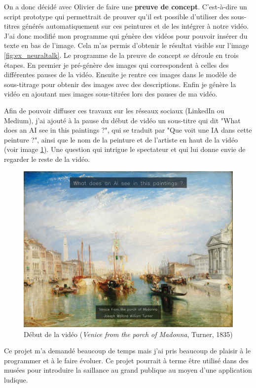 \par
On a donc décidé avec Olivier de faire une \textbf{preuve de concept}. C'est-à-dire un script prototype qui permettrait de prouver qu'il est possible d'utiliser des sous-titres générés automatiquement sur ces peintures et de les intégrer à notre vidéo. J'ai donc modifié mon programme qui génère des vidéos pour pouvoir insérer du texte en bas de l'image. Cela m'as permis d'obtenir le résultat visible sur l'image \ref{fig:ex_neuraltalk}. Le programme de la preuve de concept se déroule en trois étapes. En premier je pré-génère des images qui correspondent à celles des différentes pauses de la vidéo. Ensuite je rentre ces images dans le modèle de sous-titrage pour obtenir des images avec des descriptions. Enfin je génère la vidéo en ajoutant mes images sous-titrées lors des pauses de ma vidéo.

\par
Afin de pouvoir diffuser ces travaux sur les réseaux sociaux (LinkedIn ou Medium), j'ai ajouté à la pause du début de vidéo un sous-titre qui dit "What does an AI see in this paintings ?", qui se traduit par "Que voit une IA dans cette peinture ?", ainsi que le nom de la peinture et de l'artiste en haut de la vidéo (voir image \ref{fig:title_screen}). Une question qui intrigue le spectateur et qui lui donne envie de regarder le reste de la vidéo.

\begin{figure}[ht]
  \centering
  \includegraphics[width=0.7\linewidth]{datas/title_screen.png}
  \caption{Début de la vidéo (\emph{Venice from the porch of Madonna}, Turner, 1835)}
  \label{fig:title_screen}
\end{figure}

Ce projet m'a demandé beaucoup de temps mais j'ai pris beaucoup de plaisir à le programmer et à le faire évoluer. Ce projet pourrait à terme être utilisé dans des musées pour introduire la saillance au grand publique au moyen d'une application ludique.
